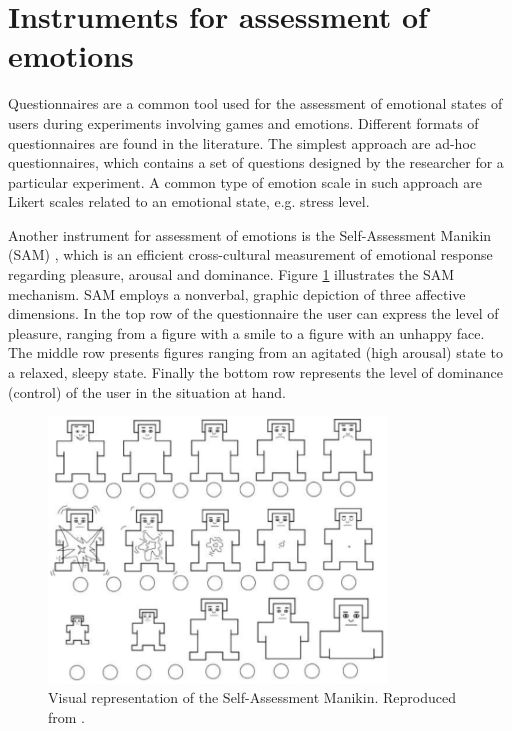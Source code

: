 
\section{Instruments for assessment of emotions}

Questionnaires are a common tool used for the assessment of emotional states of users during experiments involving games and emotions. Different formats of questionnaires are found in the literature. The simplest approach are ad-hoc questionnaires, which contains a set of questions designed by the researcher for a particular experiment. A common type of emotion scale in such approach are Likert scales related to an emotional state, e.g. stress level.

Another instrument for assessment of emotions is the Self-Assessment Manikin (SAM) \parencite{morris1995observations}, which is an efficient cross-cultural measurement of emotional response regarding pleasure, arousal and dominance. Figure \ref{fig:sam} illustrates the SAM mechanism. SAM employs a nonverbal, graphic depiction of three affective dimensions. In the top row of the questionnaire the user can express the level of pleasure, ranging from a figure with a smile to a figure with an unhappy face. The middle row presents figures ranging from an agitated (high arousal) state to a relaxed, sleepy state. Finally the bottom row represents the level of dominance (control) of the user in the situation at hand.

\begin{figure}[h]
    \centering
    \includegraphics[width=0.8\textwidth]{Content/figures/SAM.png}
    \caption{Visual representation of the Self-Assessment Manikin. Reproduced from \textcite{morris1995observations}.}
    \label{fig:sam}
\end{figure}

